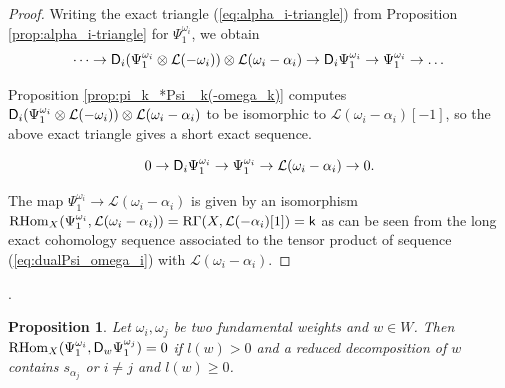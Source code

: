 \documentclass[sn-mathphys-num]{sn-jnl}%
\newcommand{\Ll}{\mathcal L}
\newcommand*{\RGamma}{\mathop{\mathrm {R\Gamma}}\nolimits}
\newcommand*{\RHom}{\mathop{\mathrm {RHom}}\nolimits}
\newcommand{\sd}{\sf D}
\newtheorem{proposition}[theorem]{Proposition}
\theoremstyle{definition}
\begin{document}
\begin{proof}
Writing the exact triangle (\ref{eq:alpha_i-triangle}) from Proposition \ref{prop:alpha_i-triangle} for $\Psi _1^{\omega _i}$, we obtain 
\begin{equation}
\dots \rightarrow {\sd }_i(\Psi _1^{\omega _i}\otimes \Ll (-\omega _i))\otimes \Ll (\omega _i-\alpha _i)\rightarrow {\sd }_i\Psi _1^{\omega _i}\rightarrow \Psi _1^{\omega _i}\rightarrow \dots 
\end{equation}

Proposition \ref{prop:pi_k_*Psi _k(-omega_k)} computes ${\sd }_i(\Psi _1^{\omega _i}\otimes \Ll (-\omega _i))\otimes \Ll (\omega _i-\alpha _i)$ to be isomorphic to $\Ll (\omega _i-\alpha _i)[-1]$, so the above exact triangle gives a short exact sequence.

\begin{equation}\label{eq:D_iPsi_1^omega_i}
0\rightarrow {\sd }_i\Psi _1^{\omega _i}\rightarrow \Psi _1^{\omega _i}\rightarrow \Ll (\omega _i-\alpha _i)\rightarrow 0.
\end{equation}

The map $\Psi _1^{\omega _i}\rightarrow \Ll (\omega _i-\alpha _i)$ is given by an isomorphism $\RHom _X(\Psi _1^{\omega _i},\Ll (\omega _i-\alpha _i)
)=\RGamma (X,\Ll (-\alpha _i)[1])={\sf k}$ as can be seen from the long exact cohomology sequence associated to the tensor product of sequence (\ref{eq:dualPsi_omega_i}) with $ \Ll (\omega _i-\alpha _i)$.
\end{proof}.

\begin{proposition}\label{prop:Psi_iD_wPsi_j-orth}
Let $\omega _i,\omega _j$ be two fundamental weights and $w\in W$. Then $\RHom _X(\Psi _1^{\omega _i},{\sf D}_w\Psi _1^{\omega _j})=0$ if $l(w)>0$ and a reduced decomposition of $w$ contains $s_{\alpha _j}$ 
or $i\neq j$ and $l(w)\geq 0$.
\end{proposition}
\end{document}
